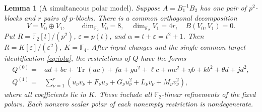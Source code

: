\documentclass[11pt,a4paper]{article}
\newtheorem{lemma}[theorem]{Lemma}
\theoremstyle{definition}
\theoremstyle{remark}
\numberwithin{equation}{section}
\newcommand{\F}{\mathbb F}
\newcommand{\Tr}{\operatorname{Tr}}
\newcommand{\eps}{\varepsilon}
\begin{document}
\begin{lemma}[A simultaneous polar model]\label{lem:polar-model}
Suppose \(A=B_1^{-1}B_2\) has one pair of \(p^2\)-blocks and \(r\)
pairs of \(p\)-blocks. There is a common orthogonal decomposition
\[
 V=V_0\oplus V_1,\qquad \dim_{\F_2}V_0=8,\quad
 \dim_{\F_2}V_1=4r,\quad B(V_0,V_1)=0.
\]
Put \(R=\F_2[t]/(p^2)\), \(\eps=p(t)\), and
\(\alpha=t+\eps=t^2+1\). Then
\(R=K[\eps]/(\eps^2)\), \(K=\F_4\).
After input changes and the single common target identification
\eqref{eq:iota}, the restrictions of \(Q\) have the forms
\begin{align}
 Q^{(0)}={}&ad+bc+\Tr(ac)+fa+ga^2+\ell c+mc^2
                    +\eta b+kb^2+\theta d+jd^2,\label{eq:all-core}\\
 Q^{(1)}={}&\sum_{\nu=1}^r
   (u_\nu v_\nu+F_\nu u_\nu+G_\nu u_\nu^2
                     +L_\nu v_\nu+M_\nu v_\nu^2),\label{eq:all-ss}
\end{align}
where all coefficients lie in \(K\).
These include all \(\F_2\)-linear refinements of the fixed polars.
Each nonzero scalar polar of each nonempty restriction is
nondegenerate.
\end{lemma}
\end{document}

